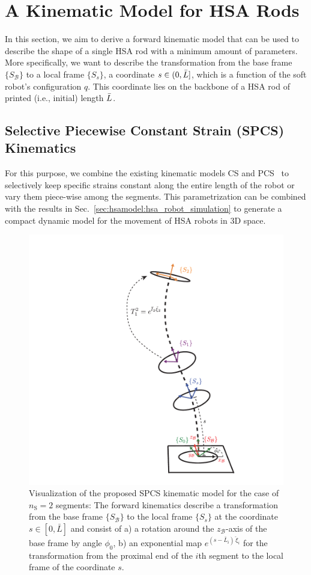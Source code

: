 \section{A Kinematic Model for HSA Rods}\label{sec:hsamodel:hsa_rod_kinematics}
In this section, we aim to derive a forward kinematic model that can be used to describe the shape of a single \gls{HSA} rod with a minimum amount of parameters. More specifically, we want to describe the transformation from the base frame $\{ S_{\mathcal{B}} \}$ to a local frame $\{ S_s \}$, a coordinate $s \in (0, \Bar{L}]$, which is a function of the soft robot's configuration $q$. This coordinate lies on the backbone of a \gls{HSA} rod of printed (i.e., initial) length $\Bar{L}$.

\subsection{Selective Piecewise Constant Strain (SPCS) Kinematics}\label{sub:hsamodel:hsa_rod_kinematics:spcs_kinematics}
For this purpose, we combine the existing kinematic models \gls{CS} and \gls{PCS}~\citep{renda2018discrete} to selectively keep specific strains constant along the entire length of the robot or vary them piece-wise among the segments.
This parametrization can be combined with the results in Sec.~\ref{sec:hsamodel:hsa_robot_simulation} to generate a compact dynamic model for the movement of HSA robots in 3D space.
\begin{figure}[htb]
    \centering
    \includegraphics[width=0.25\columnwidth]{hsamodel/figures/kinematics/twisting_kinematics_v2_cropped.pdf}
    \caption{Visualization of the proposed \gls{SPCS} kinematic model for the case of $n_\mathrm{S} = 2$ segments: The forward kinematics describe a transformation from the base frame $\{ S_{\mathcal{B}} \}$ to the local frame $\{ S_s \}$ at the coordinate $s \in [0, \bar{L}]$ and consist of a) a rotation around the $z_{\mathcal{B}}$-axis of the base frame by angle $\phi_0$, b) an exponential map $e^{(s-\bar{L}_i) \, \check{\xi}_i}$ for the transformation from the proximal end of the $i$th segment to the local frame of the coordinate $s$. %
    }
    \label{fig:hsamodel:hsa_kinematics}
\end{figure}

